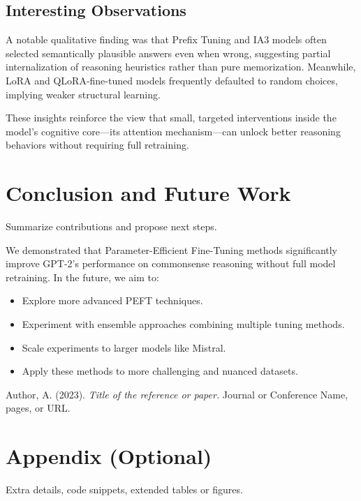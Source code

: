 \documentclass[11pt,twocolumn]{article}
\begin{document}
\subsection{Interesting Observations}
A notable qualitative finding was that Prefix Tuning and IA3 models often selected semantically plausible answers even when wrong, suggesting partial internalization of reasoning heuristics rather than pure memorization. Meanwhile, LoRA and QLoRA-fine-tuned models frequently defaulted to random choices, implying weaker structural learning.

These insights reinforce the view that small, targeted interventions inside the model's cognitive core—its attention mechanism—can unlock better reasoning behaviors without requiring full retraining.




\section{Conclusion and Future Work}
\label{sec:conclusion}
Summarize contributions and propose next steps.

We demonstrated that Parameter-Efficient Fine-Tuning methods significantly improve GPT-2's performance on commonsense reasoning without full model retraining. In the future, we aim to:
\begin{itemize}
    \item Explore more advanced PEFT techniques.
    \item Experiment with ensemble approaches combining multiple tuning methods.
    \item Scale experiments to larger models like Mistral.
    \item Apply these methods to more challenging and nuanced datasets.
\end{itemize}




\begin{thebibliography}{99}
  Author, A. (2023).
  \textit{Title of the reference or paper.}
  Journal or Conference Name, pages, or URL.
\end{thebibliography}

\appendix
\section{Appendix (Optional)}
Extra details, code snippets, extended tables or figures.
\end{document}

